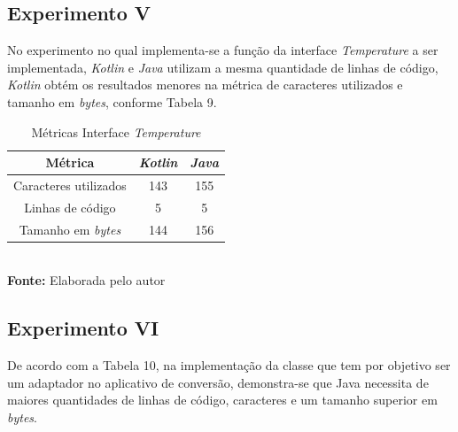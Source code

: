 \subsection{Experimento V}

No experimento no qual implementa-se a função da interface \textit{Temperature} a ser implementada, \textit{Kotlin} e \textit{Java} utilizam a mesma quantidade de linhas de código, \textit{Kotlin} obtém os resultados menores na métrica de caracteres utilizados e tamanho em \textit{bytes}, conforme Tabela 9.

\FloatBarrier
\begin{table}[!htbp]
\centering
\caption{Métricas Interface \textit{Temperature}}
	\begin{tabular}{ c | c | c }
		\hline
          \textbf{Métrica} &         \textbf{\textit{Kotlin}}    & \textbf{\textit{Java}}  \\ \hline
		
		  Caracteres utilizados   &     143 	      &          155      \\ \hline
		             
		  Linhas de código        &     5             &           5      \\ \hline
		             
		  Tamanho em \textit{bytes}        &     144           &          156      \\ \hline
		  
	\end{tabular}
	\\ \vspace{0.2cm}
	\textbf{Fonte:} Elaborada pelo autor
	\label{tab:exemplo}
\end{table}
\FloatBarrier

\subsection{Experimento VI}

De acordo com a Tabela 10, na implementação da classe que tem por objetivo ser um adaptador no aplicativo de conversão, demonstra-se que Java necessita de maiores quantidades de linhas de código, caracteres e um tamanho superior em \textit{bytes}.

